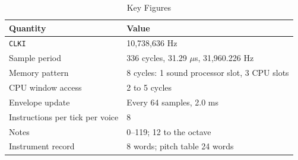 \begin{table}[H]
	\centering
	\begin{tabular}{ll}
		\toprule
		\textbf{Quantity}               & \textbf{Value}                                \\
		\midrule
		\texttt{CLKI}                   & 10,738,636 Hz                                 \\
		Sample period                   & 336 cycles, 31.29 $\mu$s, 31,960.226 Hz       \\
		Memory pattern                  & 8 cycles: 1 sound processor slot, 3 CPU slots \\
		CPU window access               & 2 to 5 cycles                                 \\
		Envelope update                 & Every 64 samples, 2.0 ms                      \\
		Instructions per tick per voice & 8                                             \\
		Notes                           & 0--119; 12 to the octave                      \\
		Instrument record               & 8 words; pitch table 24 words                 \\
		\bottomrule
	\end{tabular}
	\caption{Key Figures}
	\label{tab:qr-figures}
\end{table}
